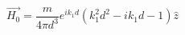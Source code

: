 \begin{equation}
    \vec{H_0} =
    \frac{m}{4\pi d^3}e^{ik_1 d}(k_1^2d^2-ik_1d-1) \hat{z}
    \label{eq:dipole_decay}
\end{equation}
